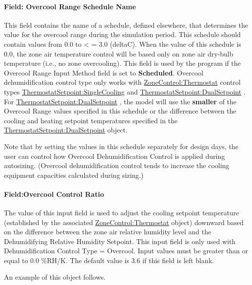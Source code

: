 \paragraph{Field: Overcool Range Schedule Name}\label{field-overcool-range-schedule-name}

This field contains the name of a schedule, defined elsewhere, that determines the value for the overcool range during the simulation period. This schedule should contain values from 0.0 to \textless{} = 3.0 (deltaC). When the value of this schedule is 0.0, the zone air temperature control will be based only on zone air dry-bulb temperature (i.e., no zone overcooling). This field is used by the program if the Overcool Range Input Method field is set to \textbf{Scheduled}. Overcool dehumidification control type only works with \hyperref[zonecontrolthermostat]{ZoneControl:Thermostat} control types \hyperref[thermostatsetpointsinglecooling]{ThermostatSetpoint:SingleCooling} and \hyperref[thermostatsetpointdualsetpoint]{ThermostatSetpoint:DualSetpoint} . For \hyperref[thermostatsetpointdualsetpoint]{ThermostatSetpoint:DualSetpoint} , the model will use the \textbf{smaller} of the Overcool Range values specified in this schedule or the difference between the cooling and heating setpoint temperatures specified in the \hyperref[thermostatsetpointdualsetpoint]{ThermostatSetpoint:DualSetpoint} object.

Note that by setting the values in this schedule separately for design days, the user can control how Overcool Dehumidification Control is applied during autosizing. (Overcool dehumidification control tends to increase the cooling equipment capacities calculated during sizing.)

\paragraph{Field:Overcool Control Ratio}\label{fieldovercool-control-ratio}

The value of this input field is used to adjust the cooling setpoint temperature (established by the associated \hyperref[zonecontrolthermostat]{ZoneControl:Thermostat} object) downward based on the difference between the zone air relative humidity level and the Dehumidifying Relative Humidity Setpoint. This input field is only used with Dehumidification Control Type = Overcool. Input values must be greater than or equal to 0.0 \%RH/K. The default value is 3.6 if this field is left blank.

An example of this object follows.

